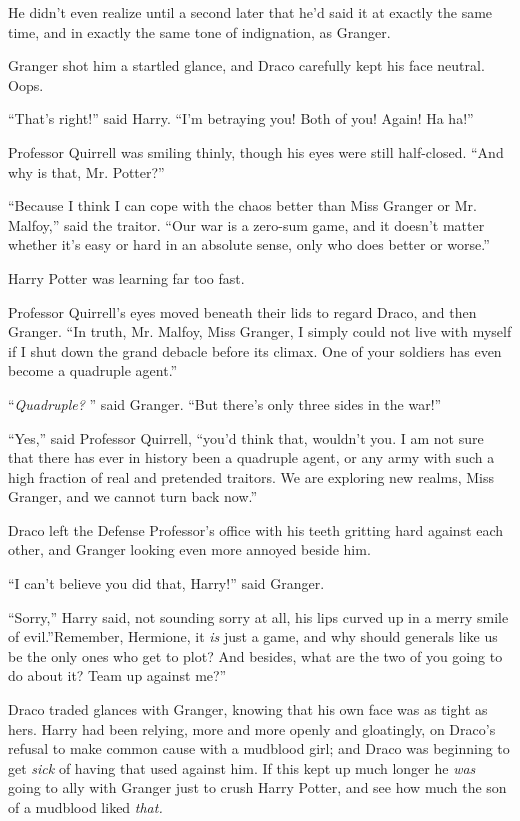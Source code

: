 He didn't even realize until a second later that he'd said it at exactly
the same time, and in exactly the same tone of indignation, as Granger.

Granger shot him a startled glance, and Draco carefully kept his face
neutral. Oops.

``That's right!'' said Harry. ``I'm betraying you! Both of you! Again!
Ha ha!''

Professor Quirrell was smiling thinly, though his eyes were still
half-closed. ``And why is that, Mr. Potter?''

``Because I think I can cope with the chaos better than Miss Granger or
Mr. Malfoy,'' said the traitor. ``Our war is a zero-sum game, and it
doesn't matter whether it's easy or hard in an absolute sense, only who
does better or worse.''

Harry Potter was learning far too fast.

Professor Quirrell's eyes moved beneath their lids to regard Draco, and
then Granger. ``In truth, Mr. Malfoy, Miss Granger, I simply could not
live with myself if I shut down the grand debacle before its climax. One
of your soldiers has even become a quadruple agent.''

``\emph{Quadruple?} '' said Granger. ``But there's only three sides in the
war!''

``Yes,'' said Professor Quirrell, ``you'd think that, wouldn't you. I am
not sure that there has ever in history been a quadruple agent, or any
army with such a high fraction of real and pretended traitors. We are
exploring new realms, Miss Granger, and we cannot turn back now.''

Draco left the Defense Professor's office with his teeth gritting hard
against each other, and Granger looking even more annoyed beside him.

``I can't believe you did that, Harry!'' said Granger.

``Sorry,'' Harry said, not sounding sorry at all, his lips curved up in
a merry smile of evil.''Remember, Hermione, it \emph{is} just a game,
and why should generals like us be the only ones who get to plot? And
besides, what are the two of you going to do about it? Team up against
me?''

Draco traded glances with Granger, knowing that his own face was as
tight as hers. Harry had been relying, more and more openly and
gloatingly, on Draco's refusal to make common cause with a mudblood
girl; and Draco was beginning to get \emph{sick} of having that used
against him. If this kept up much longer he \emph{was} going to ally
with Granger just to crush Harry Potter, and see how much the son of a
mudblood liked \emph{that.}

